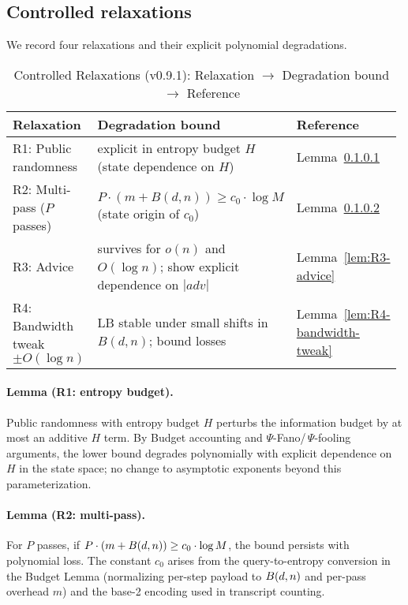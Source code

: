 \subsection{Controlled relaxations}
We record four relaxations and their explicit polynomial degradations.

\begin{table}[t]
\centering
\begingroup
\small %
\setlength{\tabcolsep}{4.5pt} %
\renewcommand{\arraystretch}{1.05} %
\caption{Controlled Relaxations (v0.9.1): Relaxation $\to$ Degradation bound $\to$ Reference}
\begin{tabular}{@{}p{0.24\linewidth}p{0.56\linewidth}p{0.18\linewidth}@{}}
\toprule
Relaxation & Degradation bound & Reference \\
\midrule
R1: Public randomness & explicit in entropy budget $H$ (state dependence on $H$) & Lemma~\ref{lem:R1-entropy-budget} \\
R2: Multi-pass ($P$ passes) & $P\cdot(m+B(d,n)) \ge c_0\cdot \log M$ (state origin of $c_0$) & Lemma~\ref{lem:R2-multipass} \\
R3: Advice & survives for $o(n)$ and $O(\log n)$; show explicit dependence on $|adv|$ & Lemma~\ref{lem:R3-advice} \\
R4: Bandwidth tweak $\pm O(\log n)$ & LB stable under small shifts in $B(d,n)$; bound losses & Lemma~\ref{lem:R4-bandwidth-tweak} \\
\bottomrule
\end{tabular}
\endgroup
\end{table}

\paragraph{Lemma (R1: entropy budget).}\label{lem:R1-entropy-budget}
Public randomness with entropy budget $H$ perturbs the information budget by at most an additive $H$ term. By Budget accounting and $\Psi$-Fano/\,$\Psi$-fooling arguments, the lower bound degrades polynomially with explicit dependence on $H$ in the state space; no change to asymptotic exponents beyond this parameterization.

\paragraph{Lemma (R2: multi-pass).}\label{lem:R2-multipass}
For $P$ passes, if $P\cdot(m+\B(d,n)) \ge c_0\cdot \log M$, the bound persists with polynomial loss. The constant $c_0$ arises from the query-to-entropy conversion in the Budget Lemma (normalizing per-step payload to $\B(d,n)$ and per-pass overhead $m$) and the base-2 encoding used in transcript counting.

